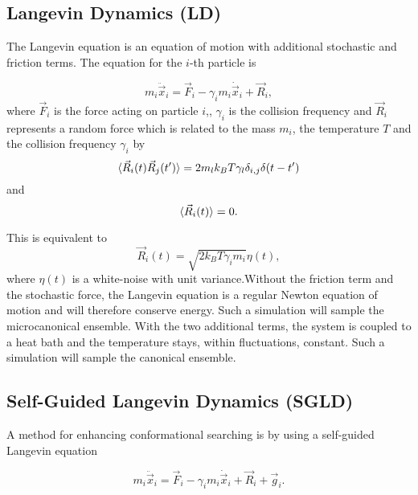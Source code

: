 \documentclass[a4paper]{article}
\begin{document}
\subsection{Langevin Dynamics (LD)}

The Langevin equation is an equation of motion with additional stochastic and friction terms. The equation for the $i$-th particle is

\begin{equation}
m_i \ddot{\vec{x}}_i = \vec{F}_i - \gamma_i m_i \dot{\vec{x}}_i + \vec{R}_i,
\label{eq:langevin_equation}
\end{equation}
where $\vec{F}_i$ is the  force acting on particle $i$,, $\gamma_i$ is the collision frequency and $\vec{R}_i$ represents a random force which is related to the mass $m_i$, the temperature $T$ and the collision frequency $\gamma_i$ by
\begin{equation}
\braket{\vec{R}_i (t) \vec{R}_j (t')} = 2 m_l k_B T \gamma_l \delta_{i,j} \delta (t-t')
\label{eq:random_force_1}
\end{equation}
and
\begin{equation}
\braket{\vec{R}_i (t)} = 0.
\label{eq:random_force_2}
\end{equation}

This is equivalent to
\begin{equation}
\vec{R}_i(t) = \sqrt{2 k_B T \gamma_i m_i} \eta(t)
\label{eq:random_force_3},
\end{equation}
where $\eta(t)$ is a white-noise with unit variance.Without the friction term and the stochastic force, the Langevin equation is a regular Newton equation of motion and will therefore conserve energy. Such a simulation will sample the microcanonical ensemble. With the two additional terms, the system is coupled to a heat bath and the temperature stays, within fluctuations, constant. Such a simulation will sample the canonical ensemble.

\subsection{Self-Guided Langevin Dynamics (SGLD)}

A method for enhancing conformational searching is by using a self-guided Langevin equation~\cite{XiongwuWu2011a}

\begin{equation}
m_i \ddot{\vec{x}}_i = \vec{F}_i - \gamma_i m_i \dot{\vec{x}}_i + \vec{R}_i + \vec{g}_i.
\label{eq:self_guided}
\end{equation}
\end{document}
